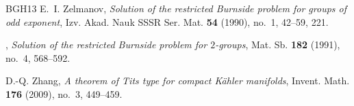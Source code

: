 \documentclass{amsart}
\theoremstyle{definition}
\begin{document}
\begin{thebibliography}{BGH{\etalchar{+}}13}
E.~I. Zelmanov, \emph{Solution of the restricted {B}urnside problem for groups
  of odd exponent}, Izv. Akad. Nauk SSSR Ser. Mat. \textbf{54} (1990), no.~1,
  42--59, 221.

\bysame, \emph{Solution of the restricted {B}urnside problem for {$2$}-groups},
  Mat. Sb. \textbf{182} (1991), no.~4, 568--592.

D.-Q. Zhang, \emph{A theorem of {T}its type for compact {K}\"{a}hler
  manifolds}, Invent. Math. \textbf{176} (2009), no.~3, 449--459.

\end{thebibliography}
\end{document}
